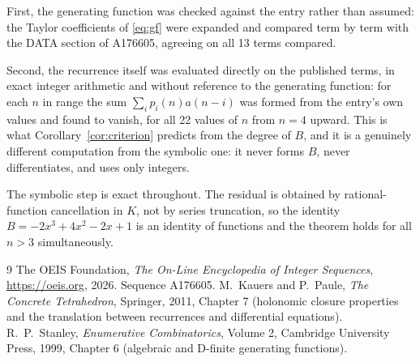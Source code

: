 \documentclass[11pt,a4paper]{article}
\theoremstyle{plain}
\theoremstyle{definition}
\begin{document}
First, the generating function was checked against the entry rather than assumed: the
Taylor coefficients of \eqref{eq:gf} were expanded and compared term by term with the DATA
section of A176605, agreeing on all 13 terms compared.

Second, the recurrence itself was evaluated directly on the published terms, in exact
integer arithmetic and without reference to the generating function: for each $n$ in range
the sum $\sum_{i}p_{i}(n)a(n-i)$ was formed from the entry's own values and found to
vanish, for all 22 values of $n$ from $n=4$ upward. This is what
Corollary~\ref{cor:criterion} predicts from the degree of $B$, and it is a genuinely
different computation from the symbolic one: it never forms $B$, never differentiates, and
uses only integers.

The symbolic step is exact throughout. The residual is obtained by rational-function
cancellation in $K$, not by series truncation, so the identity $B=- 2 x^{3} + 4 x^{2} - 2 x + 1$ is an
identity of functions and the theorem holds for all $n>3$ simultaneously.

\begin{thebibliography}{9}
 The OEIS Foundation, \emph{The On-Line Encyclopedia of Integer Sequences},
\url{https://oeis.org}, 2026. Sequence A176605.
 M.~Kauers and P.~Paule, \emph{The Concrete Tetrahedron}, Springer, 2011,
Chapter 7 (holonomic closure properties and the translation between recurrences and
differential equations).
 R.~P.~Stanley, \emph{Enumerative Combinatorics}, Volume 2, Cambridge
University Press, 1999, Chapter 6 (algebraic and D-finite generating functions).
\end{thebibliography}
\end{document}
